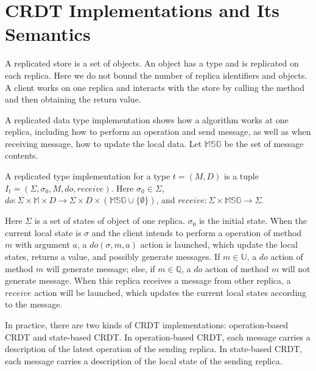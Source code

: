 
\section{CRDT Implementations and Its Semantics}
\label{sec:CRDT implementations and its semantics}

A replicated store is a set of objects. An object has a type and is replicated on each replica. Here we do not bound the number of replica identifiers and objects. A client works on one replica and interacts with the store by calling the method and then obtaining the return value.

A replicated data type implementation shows how a algorithm works at one replica, including how to perform an operation and send message, as well as when receiving message, how to update the local data. Let $\mathbb{MSG}$ be the set of message contents.  

\begin{definition}
\label{definition:replicated type implementation} 
A replicated type implementation for a type $t = (M,D)$ is a tuple $I_t = (\Sigma, \sigma_0, M, \mathit{do},\mathit{receive})$. Here $\sigma_0 \in \Sigma$, $\mathit{do}:\Sigma \times \mathbb{M} \times D \rightarrow \Sigma \times D \times (\mathbb{MSG} \cup \{ \emptyset \} )$, and $\mathit{receive}: \Sigma \times \mathbb{MSG} \rightarrow \Sigma$. 
\end{definition}

Here $\Sigma$ is a set of states of object of one replica. $\sigma_0$ is the initial state. When the current local state is $\sigma$ and the client intends to perform a operation of method $m$ with argument $a$, a $\mathit{do}(\sigma,m,a)$ action is launched, which update the local states, returns a value, and possibly generate messages. If $m \in \mathbb{U}$, a $\mathit{do}$ action of method $m$ will generate message; else, if $m \in \mathbb{Q}$, a $\mathit{do}$ action of method $m$ will not generate message. When this replica receives a message from other replica, a $\mathit{receive}$ action will be launched, which updates the current local states according to the message. 

In practice, there are two kinds of CRDT implementations: operation-based CRDT and state-based CRDT. In operation-based CRDT, each message carries a description of the latest operation of the sending replica. In state-based CRDT, each message carries a description of the local state of the sending replica. 

